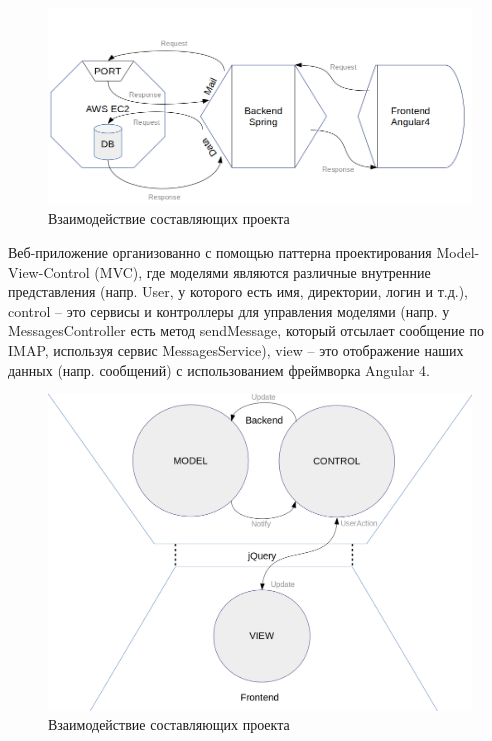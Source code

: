 \documentclass{article}
\begin{document}
\begin{figure}[H]
        \begin{flushleft}        \centerline{\includegraphics[scale=0.6]{basicscheme.png}}
        \caption{Взаимодействие составляющих проекта}
        \end{flushleft}
\end{figure}

Веб-приложение организованно с помощью паттерна проектирования Model-View-Control (MVC), где моделями являются различные внутренние представления (напр. User, у которого есть имя, директории, логин и т.д.), control -- это сервисы и контроллеры для управления моделями (напр. у MessagesController есть метод sendMessage, который отсылает сообщение по IMAP, используя сервис MessagesService), view -- это отображение наших данных (напр. сообщений) с использованием фреймворка Angular 4.

\begin{figure}[H]
        \begin{flushleft}        \centerline{\includegraphics[scale=0.3]{mvc.png}}
        \caption{Взаимодействие составляющих проекта}
        \end{flushleft}
\end{figure}
\end{document}
